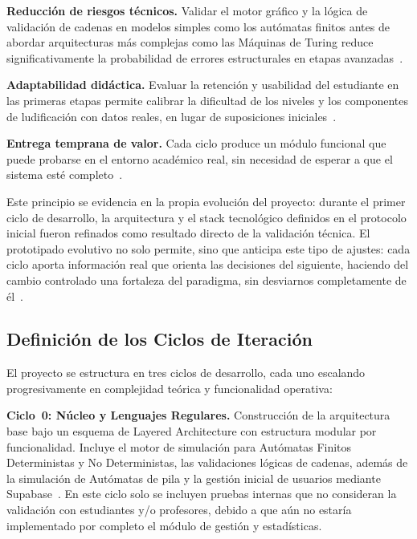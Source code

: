 \textbf{Reducción de riesgos técnicos.} Validar el motor gráfico y la lógica de validación
de cadenas en modelos simples como los autómatas finitos antes de abordar arquitecturas más
complejas como las Máquinas de Turing reduce significativamente la probabilidad de errores
estructurales en etapas avanzadas~\cite{aho2006, pressman2020}.

\textbf{Adaptabilidad didáctica.} Evaluar la retención y usabilidad del estudiante en las
primeras etapas permite calibrar la dificultad de los niveles y los componentes de
ludificación con datos reales, en lugar de suposiciones
iniciales~\cite{deterding2011, nielsen1994}.

\textbf{Entrega temprana de valor.} Cada ciclo produce un módulo funcional que puede probarse
en el entorno académico real, sin necesidad de esperar a que el sistema esté
completo~\cite{escom2016}.

Este principio se evidencia en la propia evolución del proyecto: durante el primer ciclo de
desarrollo, la arquitectura y el stack tecnológico definidos en el protocolo inicial fueron
refinados como resultado directo de la validación técnica. El prototipado evolutivo no solo
permite, sino que anticipa este tipo de ajustes: cada ciclo aporta información real que orienta
las decisiones del siguiente, haciendo del cambio controlado una fortaleza del paradigma, sin
desviarnos completamente de él~\cite{pressman2010}.

\subsection{Definición de los Ciclos de Iteración}
\label{ssec:ciclos}

El proyecto se estructura en tres ciclos de desarrollo, cada uno escalando progresivamente en
complejidad teórica y funcionalidad operativa:

\textbf{Ciclo~0: Núcleo y Lenguajes Regulares.} Construcción de la arquitectura base bajo un
esquema de Layered Architecture con estructura modular por funcionalidad. Incluye el motor de
simulación para Autómatas Finitos Deterministas y No Deterministas, las validaciones lógicas
de cadenas, además de la simulación de Autómatas de pila y la gestión inicial de usuarios
mediante Supabase~\cite{pressman2020, supabase2024}. En este ciclo solo se incluyen pruebas
internas que no consideran la validación con estudiantes y/o profesores, debido a que aún no
estaría implementado por completo el módulo de gestión y estadísticas.

